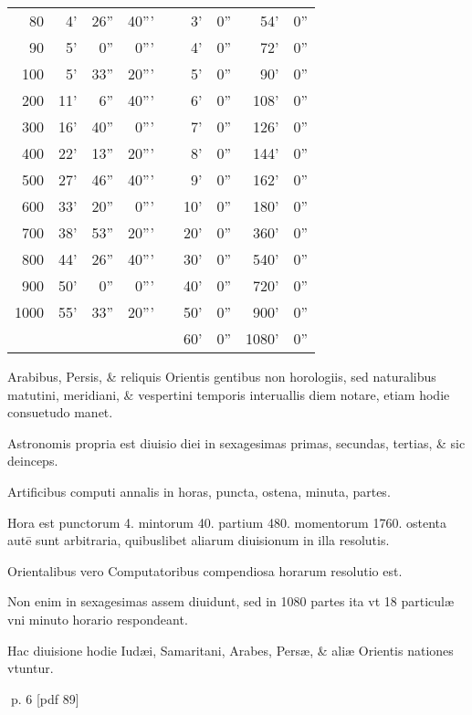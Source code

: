 \begin{parnumbers}
\begin{wraptable}{r}{0.6\textwidth}
\begin{tabular}{ |r @{}| r  r  r | c |r | r | r r | }
  80 &  4' & 26'' & 40''' & &  3' &  0'' &   54' &   0'' \\
  90 &  5' &  0'' &  0''' & &  4' &  0'' &   72' &   0'' \\
 100 &  5' & 33'' & 20''' & &  5' &  0'' &   90' &   0'' \\
 200 & 11' &  6'' & 40''' & &  6' &  0'' &  108' &   0'' \\
 300 & 16' & 40'' &  0''' & &  7' &  0'' &  126' &   0'' \\
 400 & 22' & 13'' & 20''' & &  8' &  0'' &  144' &   0'' \\
 500 & 27' & 46'' & 40''' & &  9' &  0'' &  162' &   0'' \\
 600 & 33' & 20'' &  0''' & & 10' &  0'' &  180' &   0'' \\
 700 & 38' & 53'' & 20''' & & 20' &  0'' &  360' &   0'' \\
 800 & 44' & 26'' & 40''' & & 30' &  0'' &  540' &   0'' \\
 900 & 50' &  0'' &  0''' & & 40' &  0'' &  720' &   0'' \\
1000 & 55' & 33'' & 20''' & & 50' &  0'' &  900' &   0'' \\
     &     &      &       & & 60' &  0'' & 1080' &   0'' \\
\cline{1-4} \cline{6-9}
\end{tabular}
\end{wraptable}


Arabibus, Persis, \& reliquis Orientis gentibus non horologiis, sed naturalibus matutini, meridiani, \& vespertini temporis interuallis diem notare, etiam hodie consuetudo manet.

Astronomis propria  est diuisio diei in sexagesimas primas, secundas, tertias, \& sic deinceps.

Artificibus computi annalis in horas, puncta, ostena, minuta, partes.

Hora est punctorum 4. mintorum 40. partium 480. momentorum 1760. ostenta autē sunt arbitraria, quibuslibet aliarum diuisionum in illa resolutis.

 Orientalibus vero Computatoribus compendiosa horarum resolutio est.

Non enim in sexagesimas assem diuidunt, sed in 1080 partes ita vt 18 particulæ vni minuto horario respondeant.

Hac diuisione hodie Iudæi, Samaritani, Arabes, Persæ, \& aliæ Orientis nationes vtuntur.

\end{parnumbers}
\clearpage
p. 6 [pdf 89]

